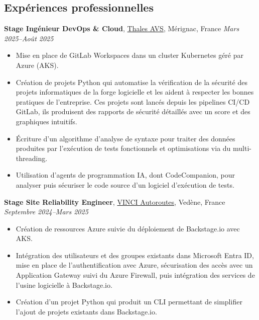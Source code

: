 \documentclass[margin,line]{../res}
\begin{document}
\begin{resume}
  \section{\sc Expériences professionnelles}
  {\bf Stage Ingénieur DevOps \& Cloud},
  \href{https://www.thalesgroup.com/fr}{Thales AVS}, Mérignac, France
  \hfill {\it Mars 2025--Août 2025}
  \vspace*{.05in}
  \begin{itemize}
    \item Mise en place de GitLab Workspaces dans un cluster
      Kubernetes géré par Azure (AKS).
    \item Création de projets Python qui automatise la vérification
      de la sécurité des
      projets informatiques de la forge logicielle et les aident à
      respecter les bonnes pratiques de l'entreprise. Ces
      projets sont lancés depuis les pipelines CI/CD GitLab, ils
      produisent des rapports de sécurité détaillés avec
      un score et des graphiques intuitifs.
    \item \'Ecriture d'un algorithme d'analyse de syntaxe pour
      traiter des données produites par l'exécution de tests
      fonctionnels et optimisations via du multi-threading.
    \item Utilisation d'agents de programmation IA, dont
      CodeCompanion, pour analyser puis sécuriser le
      code source d'un logiciel d'exécution de tests.
  \end{itemize}

  {\bf Stage Site Reliability Engineer},
  \href{https://www.vinci-autoroutes.com}{VINCI Autoroutes}, Vedène, France
  \hfill {\it Septembre 2024--Mars 2025}
  \vspace*{.05in}
  \begin{itemize}
    \item Création de ressources Azure suivie du déploiement de
      Backstage.io avec AKS.
    \item Intégration des utilisateurs et des groupes existants dans Microsoft
      Entra ID, mise en place de l'authentification avec Azure,
      sécurisation des accès avec un Application Gateway
      suivi du Azure Firewall, puis intégration des services de
      l'usine logicielle à Backstage.io.
    \item Création d'un projet Python qui produit un CLI permettant
      de simplifier l'ajout de projets existants dans Backstage.io.
  \end{itemize}


\end{resume}
\end{document}
